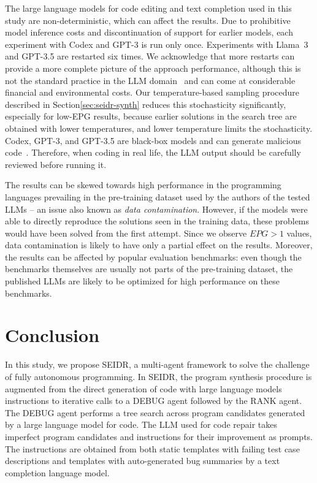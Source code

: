 The large language models for code editing and text completion used in this study are non-deterministic, 
which can affect the results. 
Due to prohibitive model inference costs and discontinuation of support for earlier models, each experiment with Codex and GPT-3 is run only once. 
Experiments with Llama~3 and GPT-3.5 are restarted six times. 
We acknowledge that more restarts can provide a more complete picture of the approach performance,
although this is not the standard practice in the LLM domain~\cite{ouyang2023:llm} 
and can come at considerable financial and environmental costs.
Our temperature-based sampling procedure described in Section\ref{sec:seidr-synth} reduces this stochasticity significantly, especially for low-EPG results, because earlier solutions in the search tree are obtained with lower temperatures, and lower temperature limits the stochasticity.
Codex, GPT-3, and GPT-3.5 are black-box models and can generate malicious code~\cite{pearceAsleepKeyboardAssessing2022}. 
Therefore, when coding in real life, the LLM output should be carefully reviewed before running it.

The results can be skewed towards high performance in the programming languages prevailing in the pre-training dataset used by the authors of the tested LLMs -- an issue also known as \emph{data contamination}.
However, if the models were able to directly reproduce the solutions seen in the training data, 
these problems would have been solved from the first attempt.
Since we observe $EPG>1$ values, data contamination is likely to have only a partial effect on the results.
Moreover, the results can be affected by popular evaluation benchmarks: even though the benchmarks themselves are usually not parts of the pre-training dataset, the published LLMs are likely to be optimized for high performance on these benchmarks.   

\section{Conclusion}
\label{sec:seidr-conclusion}

In this study, we propose SEIDR, a multi-agent framework to solve the challenge of fully autonomous programming. 
In SEIDR, the program synthesis procedure is augmented from the direct generation of code with large language models instructions to iterative calls to a DEBUG agent followed by the RANK agent. 
The DEBUG agent performs a tree search across program candidates generated by a large language model for code.
The LLM used for code repair takes imperfect program candidates and instructions for their improvement as prompts. 
The instructions are obtained from both static templates with failing test case descriptions and templates with auto-generated bug summaries by a text completion language model. 

